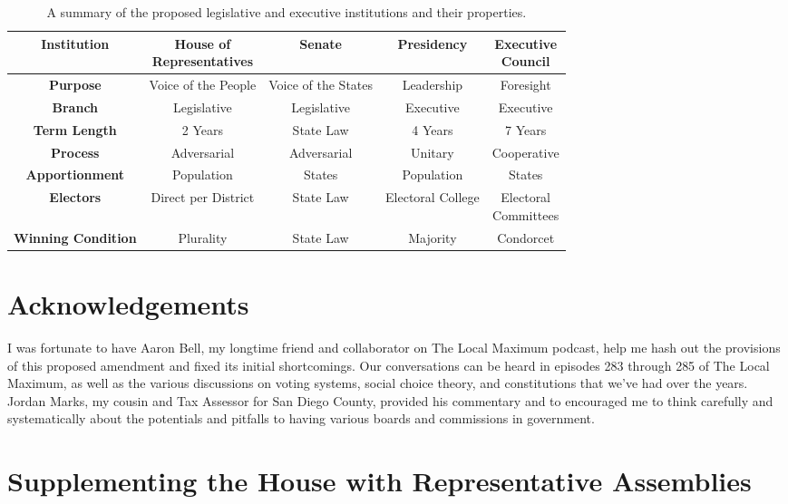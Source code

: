 \documentclass{article}
\begin{document}
\begin{table}[ht]
\centering
\renewcommand{\arraystretch}{1.5}
\begin{tabular}{|c|c|c|c|c|}
\hline
\textbf{Institution} & \makecell{House of \\ Representatives} & Senate & Presidency & \makecell{Executive \\ Council}  \\
\hline
\textbf{Purpose} & Voice of the People & Voice of the States & Leadership & Foresight \\
\hline
\textbf{Branch} & Legislative & Legislative & Executive & Executive \\
\hline
\textbf{Term Length} & 2 Years & State Law & 4 Years & 7 Years \\
\hline
\textbf{Process} & Adversarial & Adversarial & Unitary & Cooperative \\
\hline
\textbf{Apportionment} & Population & States & Population & States  \\
\hline
\textbf{Electors} & Direct per District & State Law  & Electoral College & \makecell{Electoral\\Committees}  \\
\hline
\textbf{Winning Condition} & Plurality & State Law & Majority & Condorcet  \\
\hline
\end{tabular}
\caption{A summary of the proposed legislative and executive institutions and their properties. }
\label{table:institutions}
\end{table}

\section*{Acknowledgements}

I was fortunate to have Aaron Bell, my longtime friend and collaborator on The Local Maximum podcast, help me hash out the provisions of this proposed amendment and fixed its initial shortcomings. Our conversations can be heard in episodes 283 through 285 of The Local Maximum, as well as the various discussions on voting systems, social choice theory, and constitutions that we've had over the years. Jordan Marks, my cousin and Tax Assessor for San Diego County, provided his commentary and to encouraged me to think carefully and systematically about the potentials and pitfalls to having various boards and commissions in government.

\appendix
\section{Supplementing the House with Representative Assemblies}
\label{appendix:house}
\end{document}
